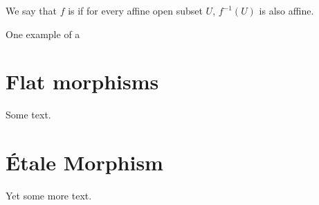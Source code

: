\begin{defn}
We say that $f$ is  if for every 
affine open subset $U$, $f^{-1}(U)$ is also affine. 
\end{defn}

One example of a 

\section{Flat morphisms}

Some text.

\section{\'Etale Morphism}

Yet some more text.

